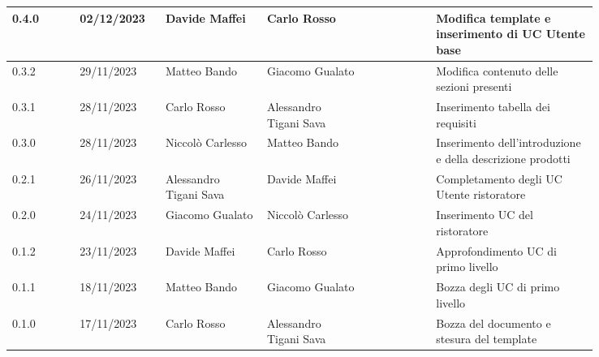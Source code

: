 {\begin{longtable}{p{0.10\linewidth}p{0.10\linewidth}p{0.15\linewidth}p{0.15\linewidth}p{0.10\linewidth}p{0.24\linewidth}}
	\hline
	0.4.0	& 02/12/2023	& Davide Maffei			& Carlo Rosso			&   & Modifica template e inserimento di UC Utente base	\\
	\hline
	0.3.2	& 29/11/2023	& Matteo Bando			& Giacomo Gualato		& 	& Modifica contenuto delle sezioni presenti \\
	\hline
	0.3.1	& 28/11/2023	& Carlo Rosso			& Alessandro Tigani Sava &	& Inserimento tabella dei requisiti			\\
	\hline
	0.3.0	& 28/11/2023	& Niccolò Carlesso		& Matteo Bando			&	& Inserimento dell'introduzione e della descrizione prodotti \\
	\hline
	0.2.1	& 26/11/2023	& Alessandro Tigani Sava & Davide Maffei		&	& Completamento degli UC Utente ristoratore	\\
	\hline
	0.2.0	& 24/11/2023	& Giacomo Gualato		& Niccolò Carlesso		&	& Inserimento UC del ristoratore			\\
	\hline
	0.1.2	& 23/11/2023	& Davide Maffei			& Carlo Rosso			&	& Approfondimento UC di primo livello		\\
	\hline
	0.1.1	& 18/11/2023	& Matteo Bando			& Giacomo Gualato		&	& Bozza degli UC di primo livello			\\
	\hline
	0.1.0	& 17/11/2023	& Carlo Rosso			& Alessandro Tigani Sava &	& Bozza del documento e stesura del template \\
\end{longtable}
}
